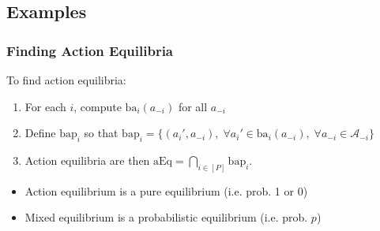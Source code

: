 \subsection{Examples}
\subsubsection{Finding Action Equilibria}
\begin{process} To find action equilibria:
    \begin{enumerate}
        \item For each $i$, compute $\text{ba}_i (a_{-i})$ for all $a_{-i}$
        \item Define $\text{bap}_i$ so that $\text{bap}_i = \{(a_i',a_{-i}), \; \forall a_i' \in \text{ba}_i (a_{-i}), \; \forall a_{-i} \in \mathcal{A}_{-i}\}$
        \item Action equilibria are then $\text{aEq} = \bigcap_{i\in [P]} \text{bap}_i$.
    \end{enumerate}
\end{process}

\begin{warning}
    \begin{itemize}
        \item Action equilibrium is a pure equilibrium (i.e. prob. 1 or 0)
        \item Mixed equilibrium is a probabilistic equilibrium (i.e. prob. $p$)
    \end{itemize}
\end{warning}

